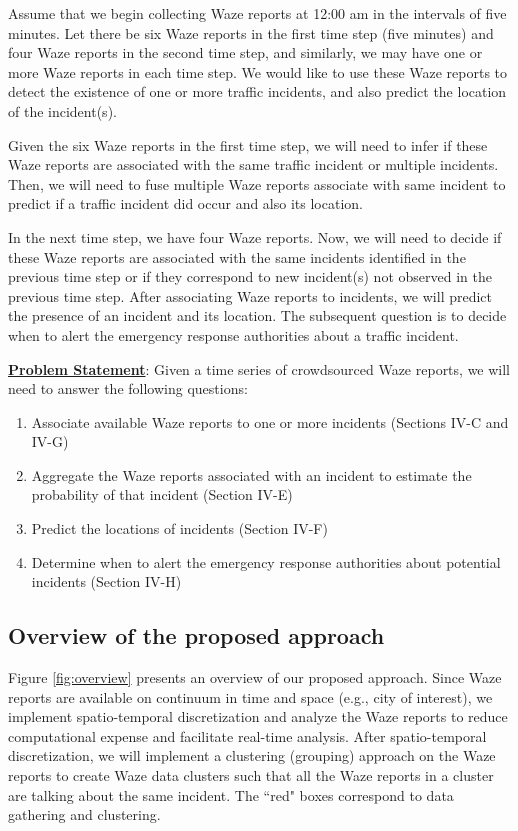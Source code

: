 \documentclass[conference]{IEEEtran}
\begin{document}
Assume that we begin collecting Waze reports at 12:00 am in the intervals of five minutes. Let there be six Waze reports in the first time step (five minutes) and four Waze reports in the second time step, and similarly, we may have one or more Waze reports in each time step. We would like to use these Waze reports to detect the existence of one or more traffic incidents, and also predict the location of the incident(s).

Given the six Waze reports in the first time step, we will need to infer if these Waze reports are associated with the same traffic incident or multiple incidents. Then, we will need to fuse multiple Waze reports associate with same incident to predict if a traffic incident did occur and also its location. 

In the next time step, we have four Waze reports. Now, we will need to decide if these Waze reports are associated with the same incidents identified in the previous time step or if they correspond to new incident(s) not observed in the previous time step. After associating Waze reports to incidents, we will predict the presence of an incident and its location. The subsequent question is to decide when to alert the emergency response authorities about a traffic incident.

\textbf{\underline{Problem Statement}}: Given a time series of crowdsourced Waze reports, we will need to answer the following questions:
\begin{enumerate}
    \item Associate available Waze reports to one or more incidents (Sections IV-C and IV-G)
    \item Aggregate the Waze reports associated with an incident to estimate the probability of that incident (Section IV-E)
    \item Predict the locations of incidents (Section IV-F)
    \item Determine when to alert the emergency response authorities about potential incidents (Section IV-H)
\end{enumerate}


\subsection{Overview of the proposed approach} 
\label{subsec:overview}

Figure \ref{fig:overview} presents an overview of our proposed approach. Since Waze reports are available on  continuum in time and space (e.g., city of interest), we implement spatio-temporal discretization and analyze the Waze reports to reduce computational expense and facilitate real-time analysis. After spatio-temporal discretization, we will implement a clustering (grouping) approach on the Waze reports to create Waze data clusters such that all the Waze reports in a cluster are talking about the same incident. The ``red" boxes correspond to data gathering and clustering.
\end{document}
